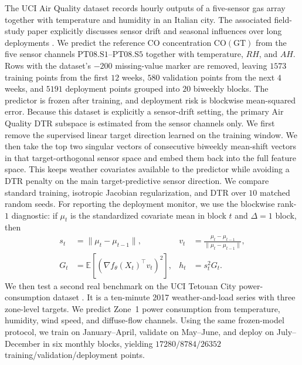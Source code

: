 \documentclass[conference]{IEEEtran}
\newcommand{\E}{\mathbb{E}}
\begin{document}
The UCI Air Quality dataset records hourly outputs of a five-sensor gas array together with temperature and humidity in an Italian city. The associated field-study paper explicitly discusses sensor drift and seasonal influences over long deployments \cite{de-vito-airquality}. We predict the reference CO concentration $\mathrm{CO(GT)}$ from the five sensor channels $\mathrm{PT08.S1}$--$\mathrm{PT08.S5}$ together with temperature, $RH$, and $AH$. Rows with the dataset's $-200$ missing-value marker are removed, leaving $1573$ training points from the first $12$ weeks, $580$ validation points from the next $4$ weeks, and $5191$ deployment points grouped into $20$ biweekly blocks. The predictor is frozen after training, and deployment risk is blockwise mean-squared error.
Because this dataset is explicitly a sensor-drift setting, the primary Air Quality DTR subspace is estimated from the sensor channels only. We first remove the supervised linear target direction learned on the training window. We then take the top two singular vectors of consecutive biweekly mean-shift vectors in that target-orthogonal sensor space and embed them back into the full feature space. This keeps weather covariates available to the predictor while avoiding a DTR penalty on the main target-predictive sensor direction. We compare standard training, isotropic Jacobian regularization, and DTR over $10$ matched random seeds. For reporting the deployment monitor, we use the blockwise rank-$1$ diagnostic: if $\mu_t$ is the standardized covariate mean in block $t$ and $\Delta=1$ block, then
\begin{align*}
s_t &= \|\mu_t-\mu_{t-1}\|, & v_t &= \frac{\mu_t-\mu_{t-1}}{\|\mu_t-\mu_{t-1}\|}, \\
G_t &= \E[(\nabla f_\theta(X_t)^\top v_t)^2], & h_t &= s_t^2 G_t.
\end{align*}
We then test a second real benchmark on the UCI Tetouan City power-consumption dataset \cite{uci-tetouan}. It is a ten-minute 2017 weather-and-load series with three zone-level targets. We predict Zone~1 power consumption from temperature, humidity, wind speed, and diffuse-flow channels. Using the same frozen-model protocol, we train on January--April, validate on May--June, and deploy on July--December in six monthly blocks, yielding $17280/8784/26352$ training/validation/deployment points.
\end{document}
